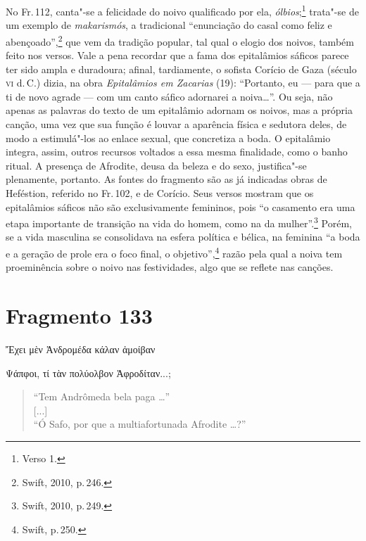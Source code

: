 No Fr.\,112, canta"-se a felicidade do noivo qualificado por ela, \emph{ólbios};\footnote{Verso 1.} trata"-se de um exemplo de \emph{makarismós}, a tradicional ``enunciação do casal como feliz e abençoado'',\footnote{Swift, 2010, p.\,246.} que vem da tradição popular, tal qual o elogio dos noivos, também feito nos versos.
Vale a pena recordar que a fama dos epitalâmios sáficos parece ter
sido ampla e duradoura; afinal, tardiamente, o sofista Corício de Gaza (século
\textsc{vi} d.\,C.) dizia, na obra \emph{Epitalâmios em Zacarias} (19): ``Portanto, eu
--- para que a ti de novo agrade --- com um canto sáfico adornarei a noiva\ldots{}''.
Ou seja, não apenas as palavras do texto de um epitalâmio adornam os noivos,
mas a própria canção, uma vez que sua função é louvar a aparência física e
sedutora deles, de modo a estimulá"-los ao enlace sexual, que concretiza a
boda. O epitalâmio integra, assim, outros recursos voltados a essa mesma finalidade,
como o banho ritual. A presença de Afrodite, deusa da beleza e do sexo,
justifica"-se plenamente, portanto. As fontes do fragmento são as já indicadas
obras de Heféstion, referido no Fr.\,102, e de Corício.
Seus versos mostram que os epitalâmios sáficos não são exclusivamente femininos, pois ``o casamento era uma etapa importante de transição na vida do homem, como na da mulher''.\footnote{Swift, 2010, p.\,249.} Porém, se a vida masculina se consolidava na esfera política e bélica, na feminina  ``a boda e a geração de prole era o foco final, o objetivo'',\footnote{Swift, p.\,250.} razão pela qual a noiva tem proeminência sobre o noivo nas festividades, algo que se reflete nas canções.



\section{Fragmento 133}

\begin{gkverse}
Ἔχει μὲν Ἀνδρομέδα κάλαν ἀμοίβαν\\

\medskip

\hspace*{21mm}{\minion [...]}

Ψάπφοι, τί τὰν πολύολβον Ἀφροδίταν...;
\end{gkverse}

\begin{verse}
``Tem Andrômeda bela paga \ldots{}''\\[2mm]

\hspace*{21mm}[...]\\[2mm]

``Ó Safo, por que a multiafortunada Afrodite \ldots{}?''
\end{verse}

